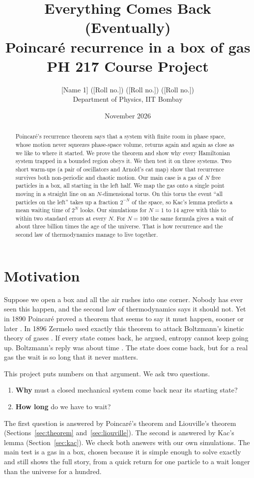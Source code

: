 \documentclass[11pt,a4paper]{article}
\title{\textbf{Everything Comes Back (Eventually)}\\[4pt]
\large Poincar\'e recurrence in a box of gas\\[2pt]
\normalsize PH 217 Course Project}
\author{[Name 1] ([Roll no.]) \quad [Name 2] ([Roll no.]) \quad [Name 3] ([Roll no.])\\[2pt]
\small Department of Physics, IIT Bombay}
\date{November 2026}
\theoremstyle{definition}
\begin{document}
\maketitle

\begin{abstract}
\noindent
Poincar\'e's recurrence theorem says that a system with finite room in phase space, whose motion never squeezes phase-space volume, returns again and again as close as we like to where it started. We prove the theorem and show why every Hamiltonian system trapped in a bounded region obeys it. We then test it on three systems. Two short warm-ups (a pair of oscillators and Arnold's cat map) show that recurrence survives both non-periodic and chaotic motion. Our main case is a gas of $N$ free particles in a box, all starting in the left half. We map the gas onto a single point moving in a straight line on an $N$-dimensional torus. On this torus the event ``all particles on the left'' takes up a fraction $2^{-N}$ of the space, so Kac's lemma predicts a mean waiting time of $2^N$ looks. Our simulations for $N = 1$ to $14$ agree with this to within two standard errors at every $N$. For $N = 100$ the same formula gives a wait of about three billion times the age of the universe. That is how recurrence and the second law of thermodynamics manage to live together.
\end{abstract}

\setcounter{tocdepth}{1}
\tableofcontents
\vspace{0.5em}

\section{Motivation}

Suppose we open a box and all the air rushes into one corner. Nobody has ever seen this happen, and the second law of thermodynamics says it should not. Yet in 1890 Poincar\'e proved a theorem that seems to say it must happen, sooner or later \cite{poincare}. In 1896 Zermelo used exactly this theorem to attack Boltzmann's kinetic theory of gases \cite{zermelo}. If every state comes back, he argued, entropy cannot keep going up. Boltzmann's reply was about time \cite{boltzmann}. The state does come back, but for a real gas the wait is so long that it never matters.

This project puts numbers on that argument. We ask two questions.
\begin{enumerate}
  \item \textbf{Why} must a closed mechanical system come back near its starting state?
  \item \textbf{How long} do we have to wait?
\end{enumerate}
The first question is answered by Poincar\'e's theorem and Liouville's theorem (Sections~\ref{sec:theorem} and~\ref{sec:liouville}). The second is answered by Kac's lemma (Section~\ref{sec:kac}). We check both answers with our own simulations. The main test is a gas in a box, chosen because it is simple enough to solve exactly and still shows the full story, from a quick return for one particle to a wait longer than the universe for a hundred.
\end{document}

